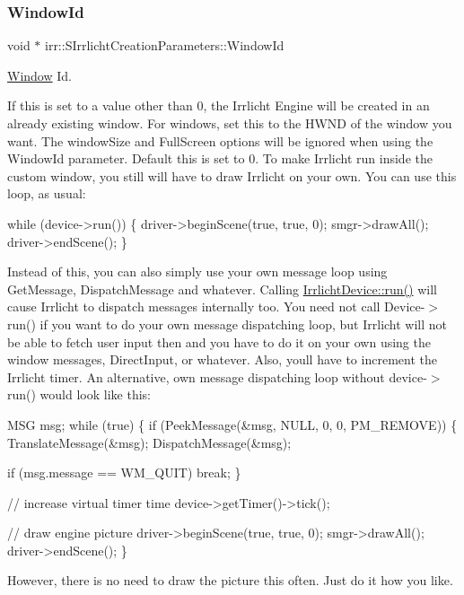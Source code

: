 \subsubsection{\texorpdfstring{Window\+Id}{WindowId}}
{\footnotesize\ttfamily void $\ast$ irr\+::\+S\+Irrlicht\+Creation\+Parameters\+::\+Window\+Id}



\hyperlink{classWindow}{Window} Id. 

If this is set to a value other than 0, the Irrlicht Engine will be created in an already existing window. For windows, set this to the H\+W\+ND of the window you want. The window\+Size and Full\+Screen options will be ignored when using the Window\+Id parameter. Default this is set to 0. To make Irrlicht run inside the custom window, you still will have to draw Irrlicht on your own. You can use this loop, as usual\+: 
\begin{DoxyCode}
\textcolor{keywordflow}{while} (device->run())
\{
    driver->beginScene(\textcolor{keyword}{true}, \textcolor{keyword}{true}, 0);
    smgr->drawAll();
    driver->endScene();
\}
\end{DoxyCode}
 Instead of this, you can also simply use your own message loop using Get\+Message, Dispatch\+Message and whatever. Calling \hyperlink{classirr_1_1IrrlichtDevice_a0489f8151dc43f6f41503ffb5a160b35}{Irrlicht\+Device\+::run()} will cause Irrlicht to dispatch messages internally too. You need not call Device-\/$>$run() if you want to do your own message dispatching loop, but Irrlicht will not be able to fetch user input then and you have to do it on your own using the window messages, Direct\+Input, or whatever. Also, you\textquotesingle{}ll have to increment the Irrlicht timer. An alternative, own message dispatching loop without device-\/$>$run() would look like this\+: 
\begin{DoxyCode}
MSG msg;
\textcolor{keywordflow}{while} (\textcolor{keyword}{true})
\{
    \textcolor{keywordflow}{if} (PeekMessage(&msg, NULL, 0, 0, PM\_REMOVE))
    \{
        TranslateMessage(&msg);
        DispatchMessage(&msg);

        \textcolor{keywordflow}{if} (msg.message == WM\_QUIT)
            \textcolor{keywordflow}{break};
    \}

    \textcolor{comment}{// increase virtual timer time}
    device->getTimer()->tick();

    \textcolor{comment}{// draw engine picture}
    driver->beginScene(\textcolor{keyword}{true}, \textcolor{keyword}{true}, 0);
    smgr->drawAll();
    driver->endScene();
\}
\end{DoxyCode}
 However, there is no need to draw the picture this often. Just do it how you like. \mbox{\label{structirr_1_1SIrrlichtCreationParameters_acae5b5e41cec776aa4d05a03f16c57f2}} 
